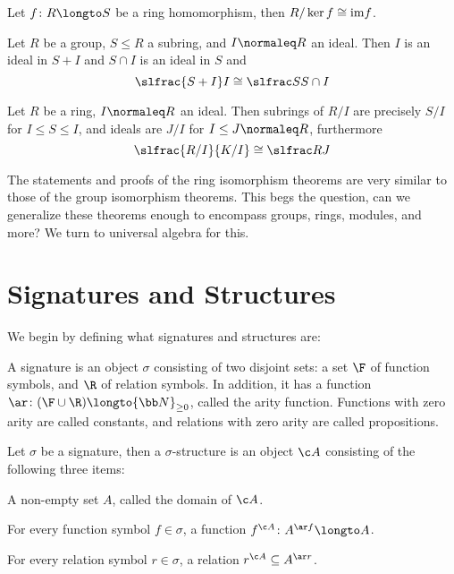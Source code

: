     Let $f\colon R\longto S$ be a ring homomorphism, then $R/\ker f\cong{\rm im}f$.

\ethrm

\bthrm[title=The Second Ring Isomorphism Theorm]

    Let $R$ be a group, $S\leq R$ a subring, and $I\normaleq R$ an ideal.
    Then $I$ is an ideal in $S+I$ and $S\cap I$ is an ideal in $S$ and
    $$ \slfrac{S+I}I \cong \slfrac S{S\cap I} $$

\ethrm

\bthrm[title=The Third Ring Isomorphism Theorm]

    Let $R$ be a ring, $I\normaleq R$ an ideal.
    Then subrings of $R/I$ are precisely $S/I$ for $I\leq S\leq I$, and ideals are $J/I$ for $I\leq J\normaleq R$, furthermore
    $$ \slfrac{R/I}{K/I} \cong \slfrac RJ $$

\ethrm

The statements and proofs of the ring isomorphism theorems are very similar to those of the group isomorphism theorems.
This begs the question, can we generalize these theorems enough to encompass groups, rings, modules, and more?
We turn to universal algebra for this.

\section{Signatures and Structures}

We begin by defining what signatures and structures are:

\bdefn

    A {\emphcolor signature} is an object $\sigma$ consisting of two disjoint sets: a set $\F$ of function symbols, and $\R$ of relation symbols.
    In addition, it has a function $\ar\colon(\F\cup\R)\longto{\bb N}_{\geq0}$, called the {\emphcolor arity function}.
    Functions with zero arity are called {\emphcolor constants}, and relations with zero arity are called {\emphcolor propositions}.

\edefn

\bdefn

    Let $\sigma$ be a signature, then a {\emphcolor $\sigma$-structure} is an object $\c A$ consisting of the following three items:
    \benum
        \item A non-empty set $A$, called the {\emphcolor domain} of $\c A$.
        \item For every function symbol $f\in\sigma$, a function $f^{\c A}\colon A^{\ar f}\longto A$.
        \item For every relation symbol $r\in\sigma$, a relation $r^{\c A}\subseteq A^{\ar r}$.
    \eenum

